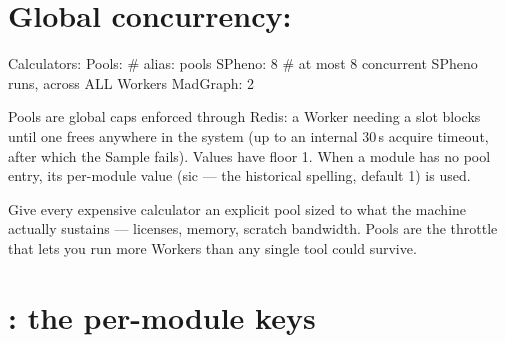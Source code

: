 \section{Global concurrency: }
\label{sec:pools}

\begin{yamlwin}
Calculators:
  Pools:            # alias: pools
    SPheno: 8       # at most 8 concurrent SPheno runs, across ALL Workers
    MadGraph: 2
\end{yamlwin}

Pools are global caps enforced through Redis: a Worker needing a slot blocks until one
frees anywhere in the system (up to an internal 30\,s acquire timeout, after which the
Sample fails). Values have floor 1. When a module has no pool entry, its per-module
 value (sic --- the historical spelling, default 1) is used.

\begin{jtip}
Give every expensive calculator an explicit pool sized to what the machine actually
sustains --- licenses, memory, scratch bandwidth. Pools are the throttle that lets you
run more Workers than any single tool could survive.
\end{jtip}

\section{: the per-module keys}
\label{sec:calc-module-keys}

